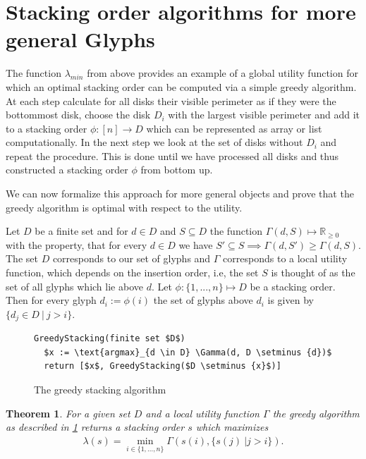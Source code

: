 \documentclass[a4paper,11pt]{article}
\newtheorem{theorem}{Theorem}
\begin{document}
\section{Stacking order algorithms for more general Glyphs}

The function $\lambda_{min}$ from above provides an example of a global utility function for which an optimal stacking order can be computed via a simple greedy algorithm. At each step calculate for all disks their visible perimeter as if they were the bottommost disk, choose the disk $D_i$ with the largest visible perimeter and add it to a stacking order $\phi: [n]\rightarrow D$ which can be represented as array or list computationally. In the next step we look at the set of disks without $D_i$ and repeat the procedure. This is done until we have processed all disks and thus constructed a stacking order $\phi$ from bottom up.

We can now formalize this approach for more general objects and prove that the greedy algorithm is optimal with respect to the utility.

Let $D$ be a finite set and for $d \in D$ and $S \subseteq D$ the function $ \Gamma(d, S) \mapsto \mathbb{R}_{\geq 0} $ with the property, that for every $d \in D$ we have $S' \subseteq S \implies \Gamma(d, S') \geq \Gamma(d, S)$. \\

The set $D$ corresponds to our set of glyphs and $\Gamma$ corresponds to a local utility function, which depends on the insertion order, i.e, the set $S$ is thought of as the set of all glyphs which lie above $d$. Let $\phi: \{1,...,n\} \mapsto D$ be a stacking order. Then for every glyph $d_i:=\phi(i)$ the set of glyphs above $d_i$ is given by $\{d_j\in D\ |\ j > i\}$.

\begin{figure}[H]
  \begin{lstlisting}[mathescape=true]
GreedyStacking(finite set $D$)
  $x := \text{argmax}_{d \in D} \Gamma(d, D \setminus {d})$
  return [$x$, GreedyStacking($D \setminus {x}$)]
  \end{lstlisting}
  \caption{The greedy stacking algorithm}
  \label{fig:greedyalg}
\end{figure}

\newpage

\begin{theorem}
  For a given set $D$ and a local utility function $\Gamma$ the greedy algorithm as described in \ref{fig:greedyalg} returns a stacking order $s$ which maximizes
  \begin{align*}
    \lambda(s) = \min_{i \in \{1,\dots,n\}} \Gamma(s(i), \{s(j)\ | j > i\}).
  \end{align*}
\end{theorem}
\end{document}
